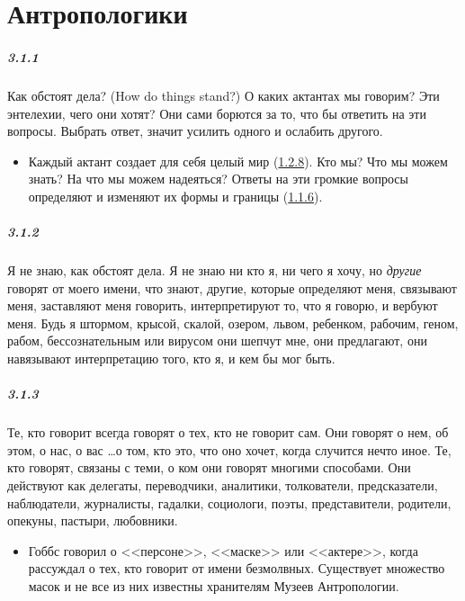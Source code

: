 \chapter{Антропологики}

\paragraph{3.1.1}\hypertarget{par:3.1.1}{} Как обстоят дела? (How do things stand?) О каких актантах мы говорим? Эти энтелехии, чего они хотят? Они сами борются за то, что бы ответить на эти вопросы. Выбрать ответ, значит усилить одного и ослабить другого. 
	\begin{itemize}
	\item 
	Каждый актант создает для себя целый мир (\hyperlink{par:1.2.8}{1.2.8}). Кто мы? Что мы можем знать? На что мы можем надеяться? Ответы на эти громкие вопросы определяют и изменяют их формы и границы (\hyperlink{par:1.1.6}{1.1.6}).
	\end{itemize}

\paragraph{3.1.2}\hypertarget{par:3.1.2}{} Я не знаю, как обстоят дела. Я не знаю ни кто я, ни чего я хочу, но {\itshape другие} говорят от моего имени, что знают, другие, которые определяют меня, связывают меня, заставляют меня говорить, интерпретируют то, что я говорю, и вербуют меня. Будь я штормом, крысой, скалой, озером, львом, ребенком, рабочим, геном, рабом, бессознательным или вирусом они шепчут мне, они предлагают, они навязывают интерпретацию того, кто я, и кем бы мог быть.


\paragraph{3.1.3}\hypertarget{par:3.1.3}{} Те, кто говорит всегда говорят о тех, кто не говорит сам. Они говорят о нем, об этом, о нас, о вас \ldots о том, кто это, что оно хочет, когда случится нечто иное. Те, кто говорят, связаны с теми, о ком они говорят многими способами. Они действуют как делегаты, переводчики, аналитики, толкователи, предсказатели, наблюдатели, журналисты, гадалки, социологи, поэты, представители, родители, опекуны, пастыри, любовники. 
	\begin{itemize}
	\item 
	Гоббс говорил о <<персоне>>, <<маске>> или <<актере>>, когда рассуждал о тех, кто говорит от имени безмолвных. Существует множество масок и не все из них известны хранителям Музеев Антропологии.
	\end{itemize}

